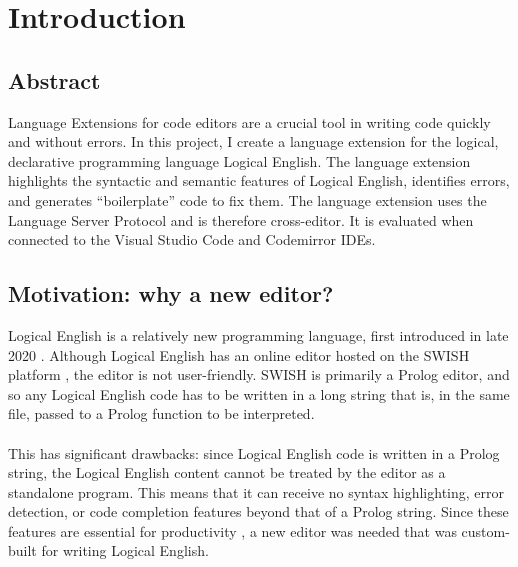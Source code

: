 \documentclass[../main.tex]{subfiles}
\begin{document}
\chapter{Introduction}
\section{Abstract}
Language Extensions for code editors are a crucial tool in writing code quickly and without errors. In this project, I create a language extension for the logical, declarative programming language Logical English. The language extension highlights the syntactic and semantic features of Logical English, identifies errors, and generates ``boilerplate'' code to fix them. The language extension uses the Language Server Protocol and is therefore cross-editor. It is evaluated when connected to the Visual Studio Code and Codemirror IDEs.

\section{Motivation: why a new editor?}
Logical English is a relatively new programming language, first introduced in late 2020 \cite{logical_english} . Although Logical English has an online editor hosted on the SWISH platform \cite{swish_editor}, the editor is not user-friendly. SWISH is primarily a Prolog editor, and so any Logical English code has to be written in a long string that is, in the same file, passed to a Prolog function to be interpreted. 
\\ 
\\ 
This has significant drawbacks: since Logical English code is written in a Prolog string, the Logical English content cannot be treated by the editor as a standalone program. This means that it can receive no syntax highlighting, error detection, or code completion features beyond that of a Prolog string. Since these features are essential for productivity , a new editor was needed that was custom-built for writing Logical English.
\end{document}
